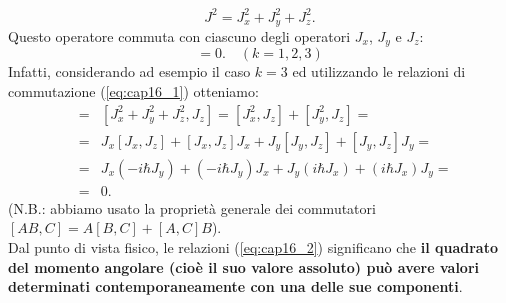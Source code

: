 \documentclass[a4paper,12pt,oneside]{book}
\begin{document}
\begin{equation}
J^2 = J_x ^2 + J_y ^2 + J_z ^2.
\end{equation}
Questo operatore commuta con ciascuno degli operatori $J_x$, $J_y$ e $J_z$:
\begin{equation}
[J^2, J_k]=0. \quad (k=1,2,3)
\label{eq:cap16_2}
\end{equation}
Infatti, considerando ad esempio il caso $k=3$ ed utilizzando le relazioni di commutazione (\ref{eq:cap16_1}) otteniamo:
\begin{eqnarray}
[J^2, J_z] &=& [J_x ^2+J_y^2+J_z ^2, J_z] = [J_x ^2, J_z]+[J_y ^2, J_z]= \nonumber \\
& =& J_x[J_x, J_z]+[J_x, J_z]J_x+J_y[J_y, J_z]+[J_y, J_z]J_y =  \nonumber \\
& = & J_x (-i\hbar J_y)+ (-i\hbar J_y)J_x+ J_y (i\hbar J_x)+(i\hbar J_x)J_y = \nonumber \\
& = & 0.  
\end{eqnarray}
(N.B.: abbiamo usato la proprietà generale dei commutatori\\ $\displaystyle{[AB,C]=A[B,C]+[A,C]B}$).\\
Dal punto di vista fisico, le relazioni (\ref{eq:cap16_2}) significano che \textbf{il quadrato del momento angolare (cioè il suo valore assoluto) può avere valori determinati contemporaneamente con una delle sue componenti}.
\end{document}
